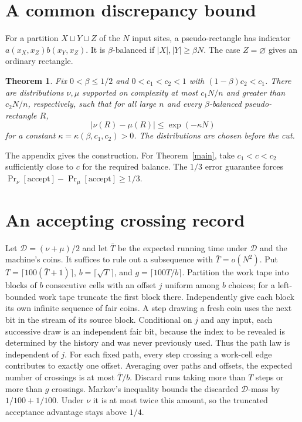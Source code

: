 \documentclass[11pt]{article}
\newtheorem{theorem}{Theorem}[section]\newtheorem{lemma}[theorem]{Lemma}\newtheorem{corollary}[theorem]{Corollary}
\begin{document}
\section{A common discrepancy bound}
For a partition $X\sqcup Y\sqcup Z$ of the $N$ input sites, a pseudo-rectangle has indicator $a(x_X,x_Z)b(x_Y,x_Z)$. It is $\beta$-balanced if $|X|,|Y|\ge\beta N$. The case $Z=\varnothing$ gives an ordinary rectangle.
\begin{theorem}\label{t:rect}
Fix $0<\beta\le1/2$ and $0<c_1<c_2<1$ with $(1-\beta)c_2<c_1$. There are distributions $\nu,\mu$ supported on complexity at most $c_1N/n$ and greater than $c_2N/n$, respectively, such that for all large $n$ and every $\beta$-balanced pseudo-rectangle $R$,
\[
 |\nu(R)-\mu(R)|\le\exp(-\kappa N)
\]
for a constant $\kappa=\kappa(\beta,c_1,c_2)>0$. The distributions are chosen before the cut.
\end{theorem}
The appendix gives the construction. For Theorem~\ref{main}, take $c_1<c<c_2$ sufficiently close to $c$ for the required balance. The $1/3$ error guarantee forces
$\Pr_\nu[\mathrm{accept}]-\Pr_\mu[\mathrm{accept}]\ge1/3$.
\section{An accepting crossing record}
Let $\mathcal D=(\nu+\mu)/2$ and let $\bar T$ be the expected running time under $\mathcal D$ and the machine's coins. It suffices to rule out a subsequence with $\bar T=o(N^2)$. Put $T=\lceil100(\bar T+1)\rceil$, $b=\lceil\sqrt T\rceil$, and $g=\lceil100T/b\rceil$. Partition the work tape into blocks of $b$ consecutive cells with an offset $j$ uniform among $b$ choices; for a left-bounded work tape truncate the first block there. Independently give each block its own infinite sequence of fair coins. A step drawing a fresh coin uses the next bit in the stream of its source block. Conditional on $j$ and any input, each successive draw is an independent fair bit, because the index to be revealed is determined by the history and was never previously used. Thus the path law is independent of $j$.
For each fixed path, every step crossing a work-cell edge contributes to exactly one offset. Averaging over paths and offsets, the expected number of crossings is at most $\bar T/b$. Discard runs taking more than $T$ steps or more than $g$ crossings. Markov's inequality bounds the discarded $\mathcal D$-mass by $1/100+1/100$. Under $\nu$ it is at most twice this amount, so the truncated acceptance advantage stays above $1/4$.
\end{document}

